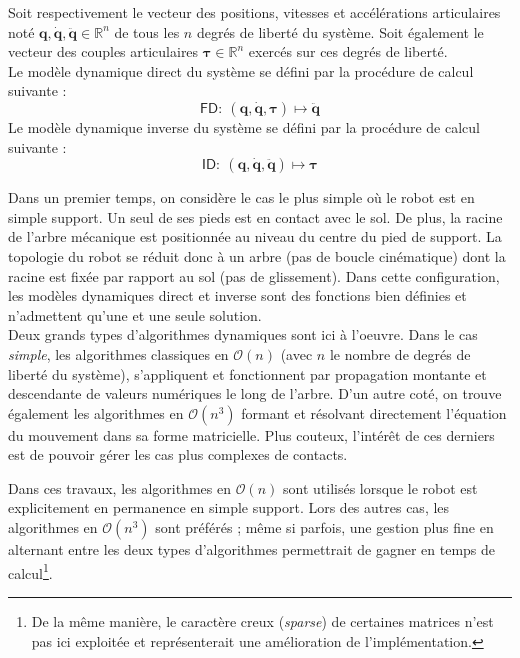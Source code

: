 \begin{definition}
    Soit respectivement le vecteur des positions, vitesses et accélérations articulaires 
    noté $\bm{q},\bm{\dot{q}},\bm{\ddot{q}} \in \mathbb{R}^n$ de tous les $n$ degrés de 
    liberté du système.
    Soit également le vecteur des couples articulaires $\bm{\tau} \in \mathbb{R}^n$ exercés 
    sur ces degrés de liberté.\\
    Le modèle dynamique direct du système se défini par la procédure de calcul suivante :
    $$\mathsf{FD} :~ (\bm{q}, \bm{\dot{q}}, \bm{\tau}) \longmapsto \bm{\ddot{q}}$$
    Le modèle dynamique inverse du système se défini par la procédure de calcul suivante :
    $$\mathsf{ID} :~ (\bm{q}, \bm{\dot{q}}, \bm{\ddot{q}}) \longmapsto \bm{\tau}$$
\end{definition}

Dans un premier temps, on considère le cas le plus simple 
où le robot est en simple support.
Un seul de ses pieds est en contact avec le sol.
De plus, la racine de l'arbre mécanique est positionnée au
niveau du centre du pied de support.
La topologie du robot se réduit donc à un arbre (pas de boucle cinématique) dont
la racine est fixée par rapport au sol (pas de glissement).
Dans cette configuration, les modèles dynamiques direct et inverse
sont des fonctions bien définies et n'admettent qu'une et une seule solution.\\

Deux grands types d'algorithmes dynamiques sont ici à l'oeuvre.
Dans le cas \textit{simple}, les algorithmes classiques en $\mathcal{O}(n)$ 
(avec $n$ le nombre de degrés de liberté du système), 
s'appliquent et fonctionnent par propagation montante et descendante
de valeurs numériques le long de l'arbre.
D'un autre coté, on trouve également les algorithmes en $\mathcal{O}(n^3)$
formant et résolvant directement l'équation du mouvement dans sa
forme matricielle. 
Plus couteux, l'intérêt de ces derniers est de pouvoir gérer 
les cas plus complexes de contacts. 

Dans ces travaux, les algorithmes en $\mathcal{O}(n)$ sont utilisés
lorsque le robot est explicitement en permanence en simple support.
Lors des autres cas, les algorithmes en $\mathcal{O}(n^3)$
sont préférés ; même si parfois, une gestion plus fine en alternant entre
les deux types d'algorithmes permettrait de gagner 
en temps de calcul\footnote{De la même manière, le caractère creux (\textit{sparse})
de certaines matrices n'est pas ici exploitée et représenterait une amélioration 
de l'implémentation.}.\\


